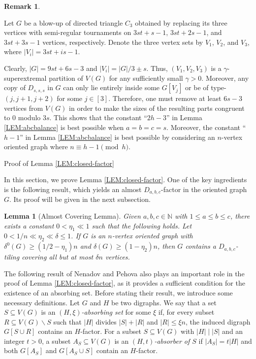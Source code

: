 \documentclass[11pt,a4paper,reqno]{amsart}
\makeatletter
\renewcommand\section{\@startsection{section}{1}%
  \z@{-1.0\linespacing\@plus-.7\linespacing}{1\linespacing}%
  {\normalfont\bfseries\large\centering}}
\newtheorem{lemma}[theorem]{Lemma}
\theoremstyle{definition} %
\newtheorem{remark}{Remark}
\makeatother
\begin{document}
\begin{remark}\label{RE:2h-3}

Let $G$ be a blow-up of directed triangle $C_3$ obtained by replacing its three vertices with semi-regular tournaments on $3st+s-1$, $3st+2s-1$, and $3st+3s-1$ vertices, respectively. Denote the three vertex sets by $V_1$, $V_2$, and $V_3$, where $|V_i|=3st+is-1$.

Clearly, $|G|=9st+6s-3$ and $|V_i|=|G|/3\pm s$. Thus, $(V_1,V_2,V_3)$ is a $\gamma$-superextremal partition of $V(G)$ for any sufficiently small $\gamma>0$. Moreover, any copy of $D_{s,s,s}$ in $G$ can only lie entirely inside some $G[V_j]$ or be of type-$(j,j+1,j+2)$ for some $j\in[3]$. Therefore, one must remove at least $6s-3$ vertices from $V(G)$ in order to make the sizes of the resulting parts congruent to $0$ modulo $3s$. This shows that the constant ``$2h-3$'' in Lemma \ref{LEM:abcbalance} is best possible when $a=b=c=s$. Moreover, the constant ``$h-1$'' in Lemma \ref{LEM:abcbalance} is best possible by considering an $n$-vertex oriented graph  where $n\equiv h-1 \pmod {h}$.
\end{remark}




\section{Proof of Lemma \ref{LEM:closed-factor}}\label{SEC-5.1}


In this section, we prove Lemma \ref{LEM:closed-factor}. One of the key ingredients is the following result, which yields an almost $D_{a,b,c}$-factor in the oriented graph $G$. Its proof will be given in the next subsection.

\begin{lemma}[Almost Covering Lemma]\label{LEM:almostDabc}
Given $a,b,c\in\mathbb{N}$ with $1\leqslant a\leqslant b\leqslant c$, there exists a constant $0<\eta_1\ll 1$ such that the following holds. Let $0<1/n\ll \eta_2\ll \delta\leqslant 1$. If $G$ is an $n$-vertex oriented graph with $\delta^0(G)\geqslant(1/2-\eta_1)n$ and $\delta(G)\geqslant(1-\eta_2)n$, then $G$ contains a $D_{a,b,c}$-tiling covering all but at most $\delta n$ vertices.
\end{lemma}

The following result of Nenadov and Pehova \cite{nenadovSJDM34} also plays an important role in the proof of Lemma \ref{LEM:closed-factor}, as it provides a sufficient condition for the existence of an absorbing set. Before stating their result, we introduce some necessary definitions. Let $G$ and $H$ be two digraphs. We say that a set $S \subseteq V(G)$ is an \emph{$(H,\xi)$-absorbing set} for some $\xi$ if, for every subset $R \subseteq V(G) \backslash S$ such that $|H|$ divides $|S| + |R|$ and $|R| \leqslant \xi n$, the induced digraph $G[S \cup R]$ contains an $H$-factor. For a subset $S\subseteq V(G)$ with $|H|\mid|S|$ and an integer $t>0$, a subset $A_S\subseteq V(G)$ is an \emph{$(H,t)$-absorber of $S$} if $|A_S|=t|H|$ and both $G[A_S]$ and $G[A_S\cup S]$ contain an $H$-factor.
\end{document}
